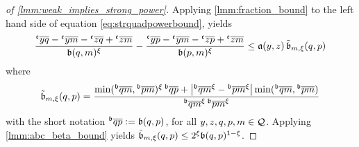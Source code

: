 %
\begin{proof}[of \autoref{lmm:weak_implies_strong_power}]
Applying \autoref{lmm:fraction_bound} to the left hand side of equation \eqref{eq:strquadpowerbound}, yields
\begin{align*}
	\frac{\olc yq - \olc ym - \olc zq + \olc zm}{\mf b(q,m)^{\xi}}
	-
	\frac{\olc yp - \olc ym - \olc zp + \olc zm}{\mf b(p,m)^{\xi}}
	\leq
	\mf a(y,z)\, \tilde {\mf b}_{m,\xi}(q,p)
\end{align*}
where
\begin{equation*}
	\tilde {\mf b}_{m,\xi}(q,p) = \frac{\min(\olb qm, \olb pm)^\xi\, \olb qp + \abs{\olb qm^\xi - \olb pm^\xi}\min(\olb qm, \olb pm)}{\olb qm^\xi\, \olb pm^\xi}
\end{equation*}
with the short notation $\olb qp := \mf b(q,p)$,
for all $y,z,q,p,m \in \mathcal{Q}$. Applying \autoref{lmm:abc_beta_bound} yields $\tilde {\mathfrak{b}}_{m,\xi}(q,p) \leq 2^\xi \mathfrak{b}(q,p)^{1-\xi}$.
\end{proof}
%
%
%
%
